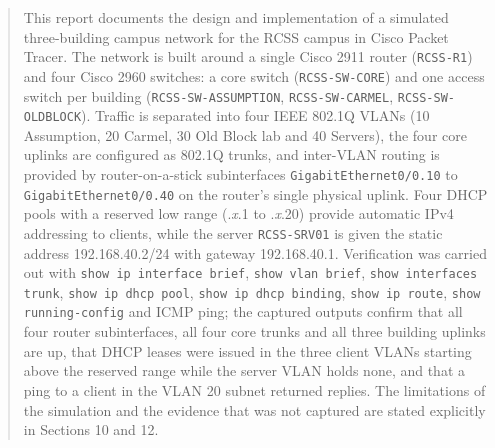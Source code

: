 \documentclass[11pt,a4paper]{article}
\begin{document}
\thispagestyle{empty}
\clearpage

\begin{abstract}
\noindent
This report documents the design and implementation of a simulated three-building campus
network for the RCSS campus in Cisco Packet Tracer. The network is built around a single
Cisco 2911 router (\texttt{RCSS-R1}) and four Cisco 2960 switches: a core switch
(\texttt{RCSS-SW-CORE}) and one access switch per building (\texttt{RCSS-SW-ASSUMPTION},
\texttt{RCSS-SW-CARMEL}, \texttt{RCSS-SW-OLDBLOCK}). Traffic is separated into four
IEEE 802.1Q VLANs (10 Assumption, 20 Carmel, 30 Old Block lab and 40 Servers), the four
core uplinks are configured as 802.1Q trunks, and inter-VLAN routing is provided by
router-on-a-stick subinterfaces \texttt{GigabitEthernet0/0.10} to
\texttt{GigabitEthernet0/0.40} on the router's single physical uplink. Four DHCP pools
with a reserved low range (.\textit{x}.1 to .\textit{x}.20) provide automatic IPv4
addressing to clients, while the server \texttt{RCSS-SRV01} is given the static address
192.168.40.2/24 with gateway 192.168.40.1. Verification was carried out with
\texttt{show ip interface brief}, \texttt{show vlan brief}, \texttt{show interfaces trunk},
\texttt{show ip dhcp pool}, \texttt{show ip dhcp binding}, \texttt{show ip route},
\texttt{show running-config} and ICMP ping; the captured outputs confirm that all four
router subinterfaces, all four core trunks and all three building uplinks are up, that
DHCP leases were issued in the three client VLANs starting above the reserved range
while the server VLAN holds none, and that a ping to a client in the VLAN 20 subnet
returned replies. The limitations of the simulation and the evidence that
was not captured are stated explicitly in Sections 10 and 12.
\end{abstract}

\thispagestyle{empty}
\clearpage

\tableofcontents
\clearpage

\listoffigures
\clearpage

\end{document}
